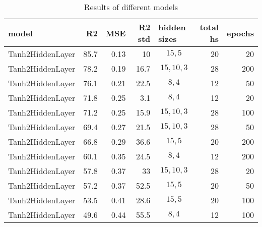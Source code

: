 
    \begin{table*}
        \centering
        \begin{tabular}{lrrrlrr}
\hline
 model            &   R2 &   MSE &   R2 std & hidden sizes   &   total hs &   epochs \\
\hline
 Tanh2HiddenLayer & 85.7 &  0.13 &     10   & \[15, 5\]      &         20 &       20 \\
 Tanh2HiddenLayer & 78.2 &  0.19 &     16.7 & \[15, 10, 3\]  &         28 &      200 \\
 Tanh2HiddenLayer & 76.1 &  0.21 &     22.5 & \[8, 4\]       &         12 &       50 \\
 Tanh2HiddenLayer & 71.8 &  0.25 &      3.1 & \[8, 4\]       &         12 &       20 \\
 Tanh2HiddenLayer & 71.2 &  0.25 &     15.9 & \[15, 10, 3\]  &         28 &      100 \\
 Tanh2HiddenLayer & 69.4 &  0.27 &     21.5 & \[15, 10, 3\]  &         28 &       50 \\
 Tanh2HiddenLayer & 66.8 &  0.29 &     36.6 & \[15, 5\]      &         20 &      200 \\
 Tanh2HiddenLayer & 60.1 &  0.35 &     24.5 & \[8, 4\]       &         12 &      200 \\
 Tanh2HiddenLayer & 57.8 &  0.37 &     33   & \[15, 10, 3\]  &         28 &       20 \\
 Tanh2HiddenLayer & 57.2 &  0.37 &     52.5 & \[15, 5\]      &         20 &       50 \\
 Tanh2HiddenLayer & 53.5 &  0.41 &     28.6 & \[15, 5\]      &         20 &      100 \\
 Tanh2HiddenLayer & 49.6 &  0.44 &     55.5 & \[8, 4\]       &         12 &      100 \\
\hline
\end{tabular}
        \caption{Results of different models}
        \label{models}
    \end{table*}
    
